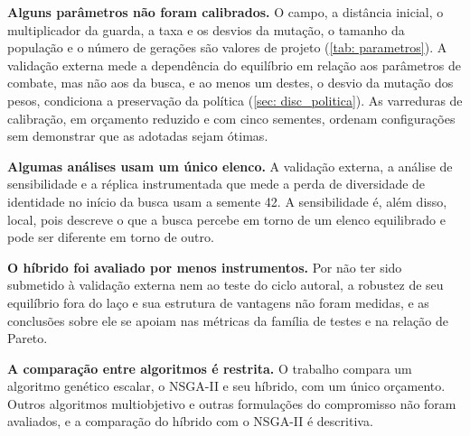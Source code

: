 \textbf{Alguns parâmetros não foram calibrados.} O campo, a distância inicial, o multiplicador da guarda, a taxa e os desvios da mutação, o tamanho da população e o número de gerações são valores de projeto (\autoref{tab: parametros}). A validação externa mede a dependência do equilíbrio em relação aos parâmetros de combate, mas não aos da busca, e ao menos um destes, o desvio da mutação dos pesos, condiciona a preservação da política (\autoref{sec: disc_politica}). As varreduras de calibração, em orçamento reduzido e com cinco sementes, ordenam configurações sem demonstrar que as adotadas sejam ótimas.

\textbf{Algumas análises usam um único elenco.} A validação externa, a análise de sensibilidade e a réplica instrumentada que mede a perda de diversidade de identidade no início da busca usam a semente 42. A sensibilidade é, além disso, local, pois descreve o que a busca percebe em torno de um elenco equilibrado e pode ser diferente em torno de outro.

\textbf{O híbrido foi avaliado por menos instrumentos.} Por não ter sido submetido à validação externa nem ao teste do ciclo autoral, a robustez de seu equilíbrio fora do laço e sua estrutura de vantagens não foram medidas, e as conclusões sobre ele se apoiam nas métricas da família de testes e na relação de Pareto.

\textbf{A comparação entre algoritmos é restrita.} O trabalho compara um algoritmo genético escalar, o NSGA-II e seu híbrido, com um único orçamento. Outros algoritmos multiobjetivo e outras formulações do compromisso não foram avaliados, e a comparação do híbrido com o NSGA-II é descritiva.
